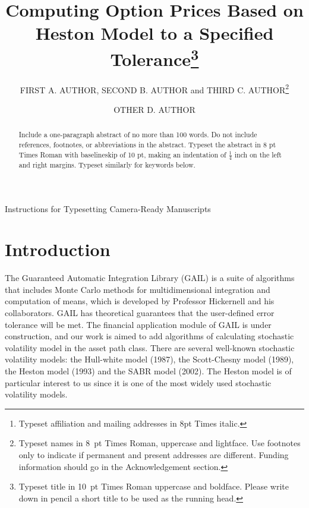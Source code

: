 \documentclass{ws-ijfe}
\begin{document}
{Instructions for Typesetting Camera-Ready Manuscripts}

\catchline{}{}{}{}{}

\title{Computing Option Prices Based on Heston Model to a Specified Tolerance\footnote{Typeset title in
10~pt Times Roman uppercase and boldface. Please write
down in pencil a short title to be used as the running head.}}

\author{FIRST A. AUTHOR, SECOND B. AUTHOR and THIRD
C. AUTHOR\footnote{Typeset names in 8~pt Times Roman, uppercase and lightface.  Use footnotes only to indicate if permanent and present addresses are different. Funding information should go in the Acknowledgement section.}}

\address{Full affiliations\footnote{Typeset
affiliation and mailing addresses in 8pt Times italic.} \\
,mailing addresses and telephone number}

\author{OTHER D. AUTHOR}

\address{Full affiliations \\
,mailing addresses and telephone number}

\maketitle

\begin{abstract}
Include a one-paragraph abstract of no more than 100 words. Do not include references, footnotes, or abbreviations in the abstract. Typeset the
abstract in 8 pt Times Roman with baselineskip of 10 pt, making
an indentation of $\frac14$ inch on the left and right margins.
Typeset similarly for keywords below.
\end{abstract}


\section{Introduction}

The Guaranteed Automatic Integration Library (GAIL) is a suite of algorithms that includes Monte Carlo methods for multidimensional integration and computation of means, which is developed by Professor Hickernell and his collaborators. GAIL has theoretical guarantees that the user-defined error tolerance will be met. The financial application module of GAIL is under construction, and our work is aimed to add algorithms of calculating stochastic volatility model in the asset path class. There are several well-known stochastic volatility models: the Hull-white model (1987), the Scott-Chesny model (1989), the Heston model (1993) and the SABR model (2002). The Heston model is of particular interest to us since it is one of the most widely used stochastic volatility models.
\end{document}
